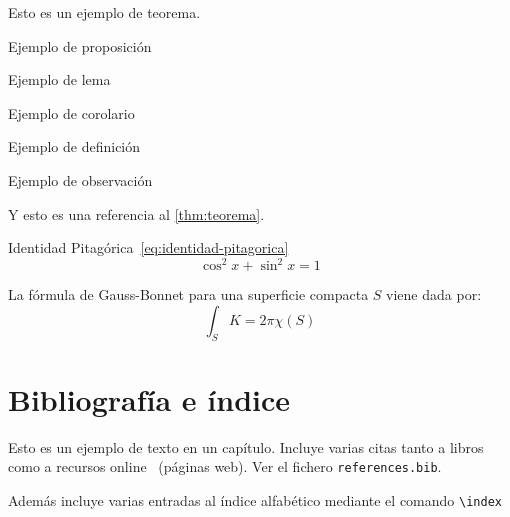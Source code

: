 \begin{teorema}\label{thm:teorema}
Esto es un ejemplo de teorema.
\end{teorema}

\begin{proposicion}
Ejemplo de proposición
\end{proposicion}

\begin{lema}
Ejemplo de lema
\end{lema}

\begin{corolario}
Ejemplo de corolario
\end{corolario}

\begin{definicion}
Ejemplo de definición
\end{definicion}

\begin{observacion}
Ejemplo de observación
\end{observacion}

Y esto es una referencia al \autoref{thm:teorema}.

Identidad Pitagórica~\eqref{eq:identidad-pitagorica}
\begin{equation}\label{eq:identidad-pitagorica}
  \cos^2 x + \sin^2 x = 1
\end{equation}

La fórmula de Gauss-Bonnet para una superficie compacta $S$ viene dada por:
\begin{equation}
  \int_S K = 2\pi\chi(S)
\end{equation}


\section{Bibliografía e índice}

Esto es un ejemplo de texto en un capítulo. Incluye varias citas tanto a libros~\cite{Euler1982, Euler1984, Euler1985} como a recursos online~\cite{EulerWiki} (páginas web). Ver el fichero \texttt{references.bib}.

Además incluye varias entradas al índice alfabético mediante el comando \verb+\index+ 


\endinput
